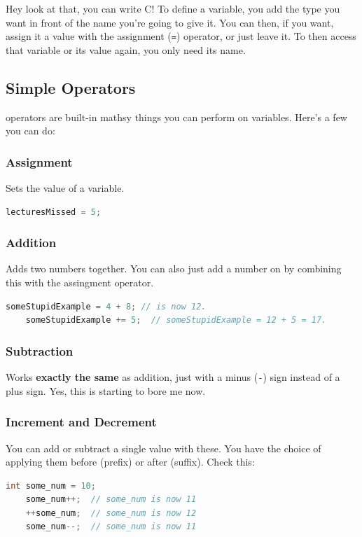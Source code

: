 Hey look at that, you can write C! To define a variable, you add the type you want in front of the name you're going to give it. You can then, if you want, assign it a value with the assignment (\texttt{=}) operator, or just leave it. To then access that variable or its value again, you only need its name.

\subsection{Simple Operators}
\Glspl{operator} are built-in mathsy things you can perform on variables. Here's a few you can do:
\subsubsection{Assignment}
Sets the value of a variable.
\begin{lstlisting}[language=C]
    lecturesMissed = 5;
\end{lstlisting}

\subsubsection{Addition}
Adds two numbers together. You can also just add a number on by combining this with the assingment operator.
\begin{lstlisting}[language=C]
    someStupidExample = 4 + 8; // is now 12.
    someStupidExample += 5;  // someStupidExample = 12 + 5 = 17.
\end{lstlisting}

\subsubsection{Subtraction}
Works \textbf{exactly the same} as addition, just with a minus (\texttt{-}) sign instead of a plus sign. Yes, this is starting to bore me now.

\subsubsection{Increment and Decrement}
You can add or subtract a single value with these. You have the choice of applying them before (prefix) or after (suffix). Check this:
\begin{lstlisting}[language=C]
    int some_num = 10;
    some_num++;  // some_num is now 11
    ++some_num;  // some_num is now 12
    some_num--;  // some_num is now 11
\end{lstlisting}

